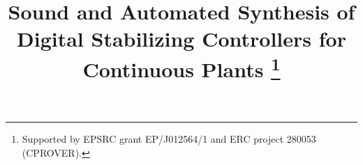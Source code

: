 \documentclass[final]{sig-alternate-05-2015}
\begin{document}

\doi{}

\isbn{}

%

\title{
Sound and Automated Synthesis of Digital Stabilizing Controllers for Continuous
Plants%
\thanks{Supported by EPSRC grant EP/J012564/1
and ERC project 280053 (CPROVER).}
}
%
%
%
%
%
\end{document}
